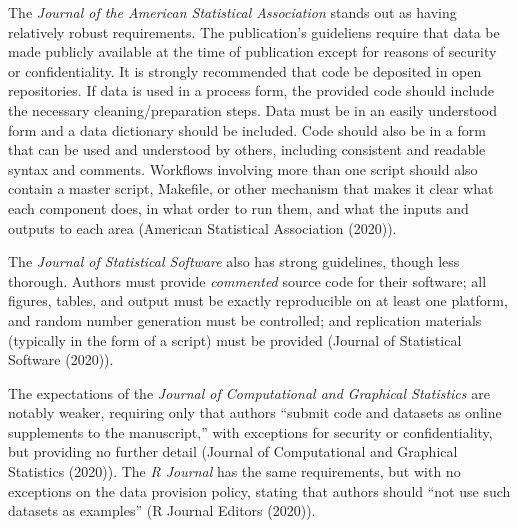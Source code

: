 \documentclass[12pt,twoside]{reedthesis}
\begin{document}
The \emph{Journal of the American Statistical Association} stands out as
having relatively robust requirements. The publication's guideliens
require that data be made publicly available at the time of publication
except for reasons of security or confidentiality. It is strongly
recommended that code be deposited in open repositories. If data is used
in a process form, the provided code should include the necessary
cleaning/preparation steps. Data must be in an easily understood form
and a data dictionary should be included. Code should also be in a form
that can be used and understood by others, including consistent and
readable syntax and comments. Workflows involving more than one script
should also contain a master script, Makefile, or other mechanism that
makes it clear what each component does, in what order to run them, and
what the inputs and outputs to each area (American Statistical
Association (2020)).

The \emph{Journal of Statistical Software} also has strong guidelines,
though less thorough. Authors must provide \emph{commented} source code
for their software; all figures, tables, and output must be exactly
reproducible on at least one platform, and random number generation must
be controlled; and replication materials (typically in the form of a
script) must be provided (Journal of Statistical Software (2020)).

The expectations of the \emph{Journal of Computational and Graphical
Statistics} are notably weaker, requiring only that authors ``submit
code and datasets as online supplements to the manuscript,'' with
exceptions for security or confidentiality, but providing no further
detail (Journal of Computational and Graphical Statistics (2020)). The
\emph{R Journal} has the same requirements, but with no exceptions on
the data provision policy, stating that authors should ``not use such
datasets as examples'' (R Journal Editors (2020)).
\end{document}
